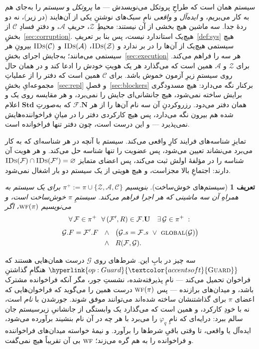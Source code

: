 \documentclass[10pt,oneside,openany]{book}
\renewcommand{\emptyset}{\varnothing}
\newcommand{\admits}{\mathbf{N}}
\newcommand{\Stdpid}{\mathbf{Std}}
\newcommand{\uses}{\mathbf{U}}
\newcommand{\WF}{\op{wf}}
\newcommand{\Corr}{\mathcal{C}}
\newcommand{\F}{\mathcal{F}}
\newcommand{\G}{\mathcal{G}}
\newcommand{\Zenv}{\mathcal{Z}}
\newcommand{\Adv}{\mathcal{A}}
\newcommand{\op}[1]{\textnormal{\textsc{#1}}}
\newcommand{\opl}[1]{\hyperlink{op:#1}{\textcolor{accentsoft}{\op{#1}}}}
\newcommand{\IDs}{\op{IDs}}
\theoremstyle{accentdef}
\newtheorem{definition}{تعریف}[chapter]
\theoremstyle{accentplain}
\begin{document}
سیستم همان است که طراحِ پروتکل می‌نویسدش --- ما \emph{پروتکل} و
\emph{سیستم} را به‌جای هم به کار می‌بریم، و \emph{ایده‌آل} و \emph{واقعی}
نامِ سبک‌های نوشتنِ یکی از آن‌هایند (در زیر)، نه دو ردهٔ جدا. سه ماشین
هیچ بخشی از آن نیستند: محیطِ $\Zenv$، حریفِ $\Adv$، و دفترِ فسادِ $\Corr$
از بخشِ~\ref{sec:corruption}. هیچ‌یک استاندارد نیست، پس بنا بر
تعریفِ~\ref{def:sys} هیچ سیستمی هیچ‌یک از آن‌ها را در بر ندارد و
$\IDs(\Zenv)$، $\IDs(\Adv)$ و $\IDs(\Corr)$ بیرونِ هر سیستمی می‌مانند؛
به‌جایش اجرای بخشِ~\ref{sec:execution} هر سه را فراهم می‌کند. برای $\Zenv$
و $\Adv$ همین است که می‌گذارد هر یک هویتِ خودش را ادعا کند و در همان حال
روی سیستمِ زیرِ آزمون خموش باشد. برای $\Corr$ همین است که دفتر را از
عملیاتِ مجموعه‌ایِ بخشِ~\ref{sec:repl} و فصلِ~\ref{sec:blockers} برکنار
نگه می‌دارد: هیچ مسدودگری برایش ساخته نمی‌شود، هیچ جانشانی‌ای جایش را
نمی‌برد، و هر مقایسه روی یک و همان دفتر می‌دود. رزروکردنِ آن سه نام آن‌ها
را از هر $\F.\admits$ که به‌صورتِ $\Stdpid$ اعلام شده هم بیرون نگه
می‌دارد، پس هیچ کارکردی دفتر را در میانِ فراخواننده‌هایش نمی‌پذیرد --- و
این درست است، چون دفتر تنها فراخوانده است.

تمایزِ شناسه‌های فرایند کارِ واقعی می‌کند. سیستم با آنچه در هر شناسه‌ای که
به کار می‌برد می‌نشاند تعیین می‌شود، پس عضویت را تنها شناسه حل می‌کند. و
هر هویت آن شناسه را در مؤلفهٔ اولش ثبت می‌کند، پس اعضای متمایز
$\IDs(\F) \cap \IDs(\F') = \emptyset$ دارند: اجتماعِ بالا مجزاست، و هیچ
هویتی از یک سیستم دو بار اشغال نمی‌شود.

\begin{definition}[سیستم‌های خوش‌ساخت]\label{def:wfsys}
بنویسیم $\pi^{+} := \pi \cup \{\Zenv,\Adv,\Corr\}$ برای یک سیستم به همراهِ
آن سه ماشینی که هر اجرا فراهم می‌کند. سیستمِ $\pi$ \emph{خوش‌ساخت} است، و
می‌نویسیم $\WF(\pi)$، اگر
\[
  \begin{gathered}
  \forall\, \F \in \pi^{+} \ \ \forall\, (\F',R) \in \F.\uses \ \ \ \exists\, \G \in \pi^{+} \;:\; \\[3pt]
  \begin{aligned}
  \G.F = \F'.F \ \ &\wedge\ \ \bigl(\G.s = \F.s \ \vee\ \op{global}(\G)\bigr) \\
  &\wedge\ \ R(\F,\G) .
  \end{aligned}
  \end{gathered}
\]
\end{definition}

سه چیز در بابِ این. شرط‌های روی $\G$ درست همان‌هایی هستند که
$\opl{Guard}$ هنگامِ گذاشتنِ فراخوان تحمیل می‌کند --- نامِ پذیرفته‌شده،
نشستِ جور، مگر آنکه فراخوانده مشترک باشد، و میدان‌های برازنده --- پس
$\WF(\pi)$ درست همین را می‌گوید که فراخوان‌هایی که اعضای $\pi$ برای
گذاشتنشان ساخته شده‌اند می‌توانند موفق شوند. جورشدن با \emph{نام} است، نه
با خودِ کارکرد، و همین است که می‌گذارد یک وابستگی از جانشانیِ زیرسیستم جان
سالم ببرد: درایه‌ای که نامِ $\varphi_q$ را می‌برد با هر چه در آن نام
بنشیند برآورده می‌شود، ایده‌آل یا واقعی، تا وقتی باقیِ شرط‌ها را برآورد. و
نیمهٔ خواسته میدان‌های فراخواننده و فراخوانده را به هم گره می‌زند؛ $\WF$
بی آن تقریباً هیچ نمی‌گفت.
\end{document}
